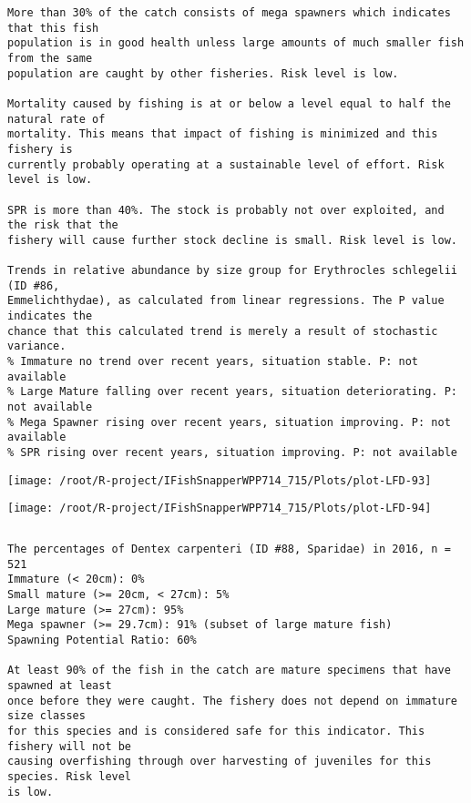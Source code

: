 \documentclass{report}\usepackage[]{graphicx}\usepackage[]{color}
\makeatletter
\def\maxwidth{ %
  \ifdim\Gin@nat@width>\linewidth
    \linewidth
  \else
    \Gin@nat@width
  \fi
}
\newenvironment{kframe}{%
 \def\at@end@of@kframe{}%
 \ifinner\ifhmode%
  \def\at@end@of@kframe{\end{minipage}}%
  \begin{minipage}{\columnwidth}%
 \fi\fi%
 \def\FrameCommand##1{\hskip\@totalleftmargin \hskip-\fboxsep
 \colorbox{shadecolor}{##1}\hskip-\fboxsep
     \hskip-\linewidth \hskip-\@totalleftmargin \hskip\columnwidth}%
 \MakeFramed {\advance\hsize-\width
   \@totalleftmargin\z@ \linewidth\hsize
   \@setminipage}}%
 {\par\unskip\endMakeFramed%
 \at@end@of@kframe}
\newenvironment{knitrout}{}{} %
\makeatother
\begin{document}
\begin{knitrout}
\begin{kframe}
\begin{verbatim}
More than 30% of the catch consists of mega spawners which indicates that this fish
population is in good health unless large amounts of much smaller fish from the same
population are caught by other fisheries. Risk level is low.
 
Mortality caused by fishing is at or below a level equal to half the natural rate of
mortality. This means that impact of fishing is minimized and this fishery is
currently probably operating at a sustainable level of effort. Risk level is low.
 
SPR is more than 40%. The stock is probably not over exploited, and the risk that the
fishery will cause further stock decline is small. Risk level is low.
 
Trends in relative abundance by size group for Erythrocles schlegelii (ID #86,
Emmelichthydae), as calculated from linear regressions. The P value indicates the
chance that this calculated trend is merely a result of stochastic variance.
% Immature no trend over recent years, situation stable. P: not available
% Large Mature falling over recent years, situation deteriorating. P: not available
% Mega Spawner rising over recent years, situation improving. P: not available
% SPR rising over recent years, situation improving. P: not available
\end{verbatim}
\end{kframe}
\texttt{[image: /root/R-project/IFishSnapperWPP714\_715/Plots/plot-LFD-93]} 

\texttt{[image: /root/R-project/IFishSnapperWPP714\_715/Plots/plot-LFD-94]} 
\begin{kframe}\begin{verbatim}
\end{verbatim}
\end{kframe}
\clearpage
\newpage
\begin{kframe}\begin{verbatim}The percentages of Dentex carpenteri (ID #88, Sparidae) in 2016, n = 521
Immature (< 20cm): 0%
Small mature (>= 20cm, < 27cm): 5%
Large mature (>= 27cm): 95%
Mega spawner (>= 29.7cm): 91% (subset of large mature fish)
Spawning Potential Ratio: 60%
 
At least 90% of the fish in the catch are mature specimens that have spawned at least
once before they were caught. The fishery does not depend on immature size classes
for this species and is considered safe for this indicator. This fishery will not be
causing overfishing through over harvesting of juveniles for this species. Risk level
is low.


\end{verbatim}
\end{kframe}
\end{knitrout}
\end{document}
